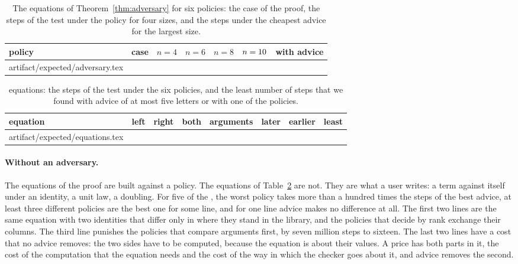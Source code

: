 \documentclass[acmsmall,nonacm,screen]{acmart}
\makeatletter
\newcommand{\claim}[2]{#2}
\newcommand{\rows}[1]{\@@input artifact/expected/#1.tex }
\makeatother
\begin{document}
\begin{table}
\caption{The equations of Theorem~\ref{thm:adversary} for six policies: the case of the proof,
the steps of the test under the policy for four sizes, and the steps under the cheapest
advice for the largest size.}
\label{tab:adversary}
\begin{tabular}{llrrrrr}
\toprule
policy & case & $n = 4$ & $n = 6$ & $n = 8$ & $n = 10$ & with advice \\
\midrule
\rows{adversary}
\bottomrule
\end{tabular}
\end{table}

\begin{table}
\caption{\exEquations{} equations: the steps of the test under the six policies, and the least
number of steps that we found with advice of at most five letters or with one of the
policies.}
\label{tab:equations}
\small
\setlength{\tabcolsep}{3pt}
\begin{tabular}{lrrrrrrr}
\toprule
equation & left & right & both & arguments & later & earlier & least \\
\midrule
\rows{equations}
\bottomrule
\end{tabular}
\end{table}

\paragraph{Without an adversary.} The equations of the proof are built against a policy. The
equations of Table~\ref{tab:equations} are not. They are what a user writes: a term against
itself under an identity, a unit law, a doubling. \claim{equations}{For five of the
\exEquations{}, the worst policy takes more than a hundred times the steps of the best
advice, at least three different policies are the best one for some line, and for one line
advice makes no difference at all.} The first two lines are the same equation with two
identities that differ only in where they stand in the library, and the policies that
decide by rank exchange their columns. The third line punishes the policies that compare
arguments first, by seven million steps to sixteen. The last two lines have a cost that no
advice removes: the two sides have to be computed, because the equation is about their
values. A price has both parts in it, the cost of the computation that the equation needs
and the cost of the way in which the checker goes about it, and advice removes the second.
\end{document}
